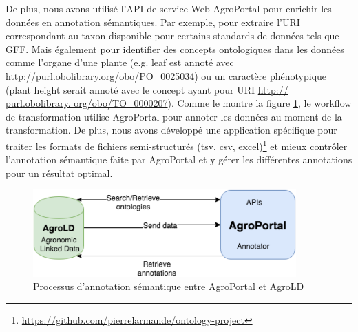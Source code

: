 De plus, nous avons utilisé l'API de service Web AgroPortal pour enrichir les données en annotation sémantiques. Par exemple, pour extraire l'URI correspondant au taxon disponible pour certains standards de données tels que GFF. Mais également pour identifier des concepts ontologiques dans les données comme l'organe d'une plante (e.g. leaf est annoté avec \url{http://purl.obolibrary.org/obo/PO\_0025034}) ou un caractère phénotypique (plant height serait annoté avec le concept ayant pour URI \url{http:// purl.obolibrary. org/obo/TO\_0000207}). Comme le montre la figure \ref{AgroPortal-AgroLD}, le workflow de transformation utilise AgroPortal pour annoter les données au moment de la transformation. De plus, nous avons développé une application spécifique pour traiter les formats de fichiers semi-structurés (tsv, csv, excel)\footnote{\url{https://github.com/pierrelarmande/ontology-project}} et mieux contrôler l'annotation sémantique faite par AgroPortal et y gérer les différentes annotations pour un résultat optimal. 


\begin{figure}[!ht]
\begin{center}
	\includegraphics[width=0.90\textwidth]{Figures/AgroPortal-AgroLD.png}
\end{center}
\caption{\label{AgroPortal-AgroLD} Processus d'annotation sémantique entre AgroPortal et AgroLD}
\end{figure}

